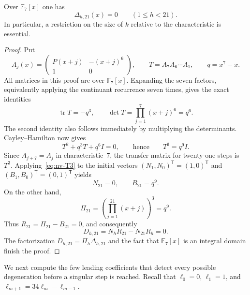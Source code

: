 
\begin{proposition}
\label{prop:nv-counterexample}
Over $\mathbb F _7[x]$ one has
\[
  \Delta_{h,21}(x)=0 \qquad (1\leq h<21).
\]
In particular, a restriction on the size of $k$ relative to the
characteristic is essential.
\end{proposition}

\begin{proof}
Put
\[
 A_j(x)=
 \begin{pmatrix}
  P(x+j)&-(x+j)^6\\
  1&0
 \end{pmatrix},
 \qquad T=A_7A_6\cdots A_1,
 \qquad q=x^7-x.
\]
All matrices in this proof are over $\mathbb F _7[x]$.
Expanding the seven factors, equivalently applying the continuant
recurrence seven times, gives the exact identities
\[
 \operatorname {tr}T=-q^3,
 \qquad
 \det T=\prod_{j=1}^7(x+j)^6=q^6.
\]
The second identity also follows immediately by multiplying the
determinants.  Cayley--Hamilton now gives
\begin{equation}
 T^2+q^3T+q^6I=0,
 \qquad\text{hence}\qquad
 T^3=q^9I.                                      \label{eq:nv-T3}
\end{equation}
Since $A_{j+7}=A_j$ in characteristic~$7$, the transfer matrix for
twenty-one steps is $T^3$.  Applying~\eqref{eq:nv-T3} to the initial vectors
$(N_1,N_0)^{\mathsf T}=(1,0)^{\mathsf T}$ and
$(B_1,B_0)^{\mathsf T}=(0,1)^{\mathsf T}$ yields
\[
 N_{21}=0,
 \qquad B_{21}=q^9.
\]
On the other hand,
\[
 \Pi_{21}
 =\left(\prod_{j=1}^{21}(x+j)\right)^3
 =q^9.
\]
Thus $R_{21}=\Pi_{21}-B_{21}=0$, and consequently
\[
 D_{h,21}=N_hR_{21}-N_{21}R_h=0.
\]
The factorization $D_{h,21}=\Pi_h\Delta_{h,21}$ and the fact that
$\mathbb F _7[x]$ is an integral domain finish the proof.
\end{proof}

We next compute the few leading coefficients that detect every possible
degeneration before a singular step is reached.  Recall that
$\ell_0=0$, $\ell_1=1$, and
$\ell_{m+1}=34\ell_m-\ell_{m-1}$.

